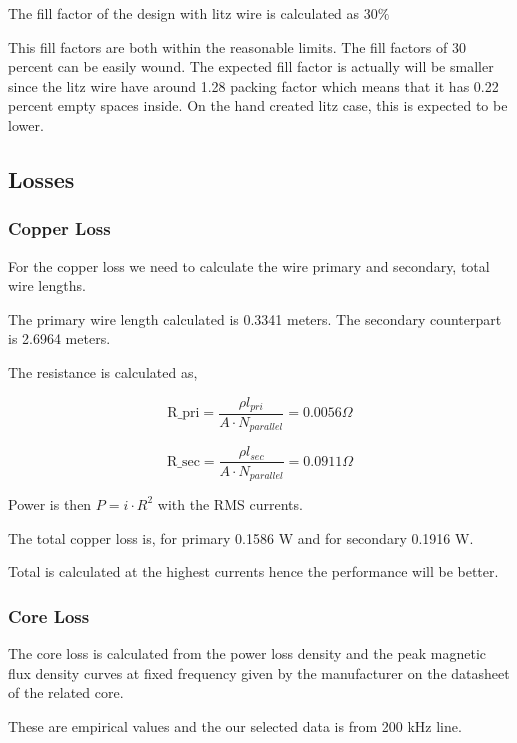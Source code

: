 \documentclass[12pt]{article}
\begin{document}
    The fill factor of the design with litz wire is calculated as $30\%$

    This fill factors are both within the reasonable limits. The fill factors of 30 percent can be easily wound. The expected fill factor is actually will be smaller since the litz wire have around 1.28 packing factor which means that it has 0.22 percent empty spaces inside. On the hand created litz case, this is expected to be lower.

    \subsection{Losses}   
    \subsubsection{Copper Loss}
    For the copper loss we need to calculate the wire primary and secondary, total wire lengths.

    The primary wire length calculated is 0.3341 meters. The secondary counterpart is 2.6964 meters.

    The resistance is calculated as,

    \begin{equation*}
        \textrm{R\_pri} = \frac{\rho l_{pri}}{A\cdot N_{parallel}} = 0.0056 \Omega
    \end{equation*}    

    \begin{equation*}
        \textrm{R\_sec} = \frac{\rho l_{sec}}{A\cdot N_{parallel}} = 0.0911 \Omega
    \end{equation*}    

    Power is then $P = i\cdot R^2$ with the RMS currents.

    The total copper loss is, for primary 0.1586 W and for secondary 0.1916 W.

    Total is calculated at the highest currents hence the performance will be better.

    \subsubsection{Core Loss}

    The core loss is calculated from the power loss density and the peak magnetic flux density curves at fixed frequency given by the manufacturer on the datasheet of the related core.

    These are empirical values and the our selected data is from 200 kHz line.
\end{document}
